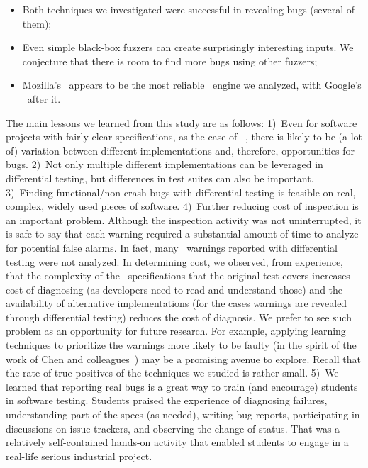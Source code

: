 \documentclass[smallextended]{svjour3}
\begin{document}
\begin{itemize}
  \item Both techniques we investigated were successful in revealing
    bugs (several of them);
  \item Even simple black-box fuzzers can create surprisingly
    interesting inputs. We conjecture that there is room to find more
    bugs using other fuzzers;
  \item Mozilla's \smonkey\ appears to be the most reliable
    \js\ engine we analyzed, with Google's \veight\ after it.
\end{itemize}

The main lessons we learned from this study are as follows: 1)~Even
for software projects with fairly clear specifications, as the case of
\javascript{}~\cite{ecmas262-spec}, there is likely to be (a lot of)
variation between different implementations and, therefore,
opportunities for bugs. 2)~Not only multiple different implementations
can be leveraged in differential testing, but differences in test
suites can also be important. 3)~Finding functional/non-crash bugs
with differential testing is feasible on real, complex, widely used
pieces of software. 4)~Further reducing cost of inspection is an
important problem. Although the inspection activity was not
uninterrupted, it is safe to say that each warning required a
substantial amount of time to analyze for potential false alarms. In
fact, many \hi\ warnings reported with differential testing were not
analyzed. In determining cost, we observed, from experience, that the
complexity of the \js\ specifications that the original test covers
increases cost of diagnosing (as developers need to read and
understand those) and the availability of alternative implementations
(for the cases warnings are revealed through differential testing)
reduces the cost of diagnosis. We prefer to see such problem as an
opportunity for future research. For example, applying learning
techniques to prioritize the warnings more likely to be faulty (in the
spirit of the work of Chen and
colleagues~\cite{Chen:2017:LPT:3097368.3097451}) may be a promising
avenue to explore. Recall that the rate of true positives of the
techniques we studied is rather small.  5)~We learned that reporting
real bugs is a great way to train (and encourage) students in software
testing. Students praised the experience of diagnosing failures,
understanding part of the specs (as needed), writing bug reports,
participating in discussions on issue trackers, and observing the
change of status. That was a relatively self-contained hands-on
activity that enabled students to engage in a real-life serious
industrial project.
\end{document}
